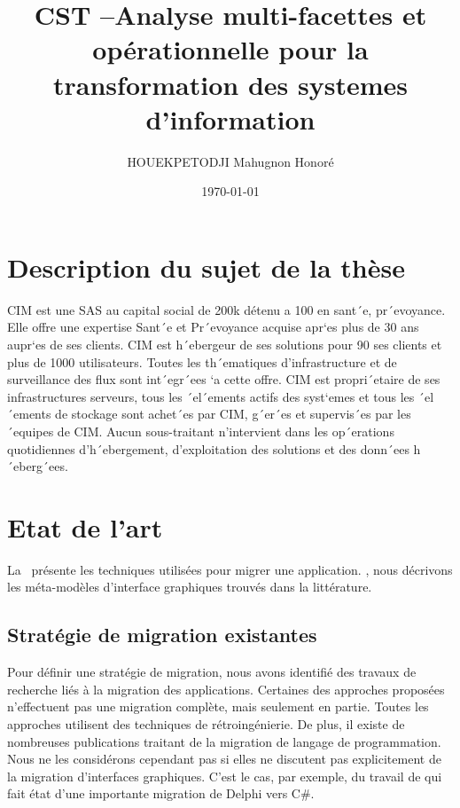\documentclass[a4paper]{article}
\title{CST --Analyse multi-facettes et opérationnelle pour la transformation des systemes d’information}
\author{ HOUEKPETODJI Mahugnon Honoré}
\begin{document}
\institution{}

\date{\today}

\maketitle


\section{Description du sujet de la thèse}
CIM est une SAS au capital social de 200k détenu a 100%
en sant´e, pr´evoyance. Elle offre une expertise Sant´e et Pr´evoyance acquise apr`es
plus de 30 ans aupr`es de ses clients. CIM est h´ebergeur de ses solutions pour 90%
ses clients et plus de 1000 utilisateurs. Toutes les th´ematiques d’infrastructure et de
surveillance des flux sont int´egr´ees `a cette offre. CIM est propri´etaire de ses infrastructures
serveurs, tous les ´el´ements actifs des syst`emes et tous les ´el´ements de stockage
sont achet´es par CIM, g´er´es et supervis´es par les ´equipes de CIM. Aucun sous-traitant
n’intervient dans les op´erations quotidiennes d’h´ebergement, d’exploitation des solutions
et des donn´ees h´eberg´ees.
\section{Etat de l'art}
\label{sec:stateOfTheArt}

La~ présente les techniques utilisées pour migrer une application.
, nous décrivons les méta-modèles d'interface graphiques trouvés dans la littérature.

\subsection{Stratégie de migration existantes}
\label{sec:migrationTechnique}

Pour définir une stratégie de migration, nous avons identifié des travaux de recherche liés à la migration des applications.
Certaines des approches proposées n'effectuent pas une migration complète, mais seulement en partie.
Toutes les approches utilisent des techniques de rétroingénierie.
De plus, il existe de nombreuses publications traitant de la migration de langage de programmation.
Nous ne les considérons cependant pas si elles ne discutent pas explicitement de la migration d'interfaces graphiques.
C'est le cas, par exemple, du travail de \citet{Bran10a} qui fait état d'une importante migration de Delphi vers C\#.
\end{document}
